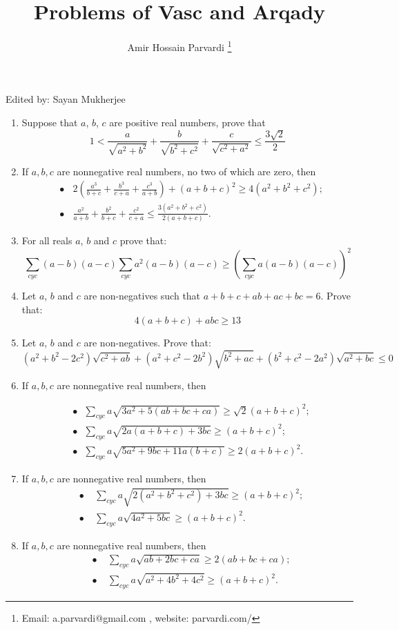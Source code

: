 \documentclass{article}
\begin{document}
\title{Problems of Vasc and Arqady}
\author{Amir Hossain Parvardi \footnote{Email: a.parvardi@gmail.com , website: parvardi.com/}}
\maketitle
\begin{center}Edited by: Sayan Mukherjee\end{center}
\begin{enumerate}
  \item  Suppose that $ a$, $ b$, $ c$ are positive real numbers, prove that
\[ 1 < \frac {a}{\sqrt{a^{2} + b^{2}}} + \frac {b}{\sqrt{b^{2} + c^{2}}} + \frac {c}{\sqrt{c^{2} + a^{2}}}\leq\frac {3\sqrt{2}}{2}\]
  \item  If $a,b,c$ are nonnegative real numbers, no two of which are zero, then
\[\begin{aligned}&\bullet \ \ \ \ 2\left(\frac {a^3}{b+c}+\frac {b^3}{c+a}+\frac {c^3}{a+b}\right)+(a+b+c)^2\ge 4(a^2+b^2+c^2);\\ &\bullet \ \ \ \ \frac {a^2}{a+b}+\frac {b^2}{b+c}+\frac {c^2}{c+a}\le \frac {3(a^2+b^2+c^2)}{2(a+b+c)}.\end{aligned}\]

  \item  For all reals $a$, $b$ and $c$ prove that:
\[\sum_{cyc}(a-b)(a-c)\sum_{cyc}a^2(a-b)(a-c)\geq\left(\sum_{cyc}a(a-b)(a-c)\right)^2\]

 \item Let $a$, $b$ and $c$ are non-negatives such that $a+b+c+ab+ac+bc=6$. Prove that:
\[4(a+b+c)+abc\geq13\]
 \item  Let $a$, $b$ and $c$ are non-negatives. Prove that:
\[(a^2+b^2-2c^2)\sqrt{c^2+ab}+(a^2+c^2-2b^2)\sqrt{b^2+ac}+(b^2+c^2-2a^2)\sqrt{a^2+bc}\leq0\]

 \item If $a,b,c$ are nonnegative real numbers, then

\[\begin{aligned}&\bullet \ \ \ \sum_{cyc} a\sqrt{3a^2+5(ab+bc+ca)}\ge \sqrt2(a+b+c)^2;\\&\bullet \ \ \ \sum_{cyc} a\sqrt{2a(a+b+c)+3bc}\ge  (a+b+c)^2;\\&\bullet \ \ \ \sum_{cyc} a\sqrt{5a^2+9bc+11a(b+c)}\ge 2(a+b+c)^2.\end{aligned}\]
 \item  If $a,b,c$ are nonnegative real numbers, then
\[\begin{aligned}&\bullet\ \ \ \ \  \sum_{cyc} a\sqrt{2(a^2+b^2+c^2)+3bc}\ge (a+b+c)^2;\\&\bullet\ \ \ \ \  \sum_{cyc} a\sqrt{4a^2+5bc}\ge (a+b+c)^2.\end{aligned}\]
 \item If $a,b,c$ are nonnegative real numbers, then
\[\begin{aligned}&\bullet\ \ \ \ \  \sum_{cyc} a\sqrt{ab+2bc+ca}\ge 2(ab+bc+ca);\\&\bullet\ \ \ \ \  \sum_{cyc} a\sqrt{a^2+4b^2+4c^2}\ge (a+b+c)^2.\end{aligned}\]


\end{enumerate}
\end{document}
